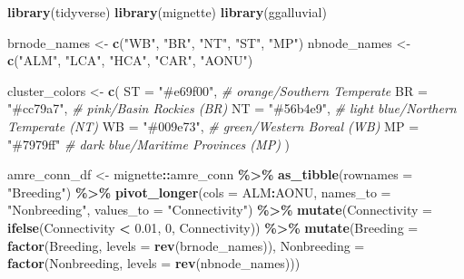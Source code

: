 \documentclass[
]{book}
\newenvironment{Shaded}{\begin{snugshade}}{\end{snugshade}}
\newcommand{\AttributeTok}[1]{\textcolor[rgb]{0.13,0.29,0.53}{#1}}
\newcommand{\CommentTok}[1]{\textcolor[rgb]{0.56,0.35,0.01}{\textit{#1}}}
\newcommand{\DecValTok}[1]{\textcolor[rgb]{0.00,0.00,0.81}{#1}}
\newcommand{\FloatTok}[1]{\textcolor[rgb]{0.00,0.00,0.81}{#1}}
\newcommand{\FunctionTok}[1]{\textcolor[rgb]{0.13,0.29,0.53}{\textbf{#1}}}
\newcommand{\NormalTok}[1]{#1}
\newcommand{\OtherTok}[1]{\textcolor[rgb]{0.56,0.35,0.01}{#1}}
\newcommand{\SpecialCharTok}[1]{\textcolor[rgb]{0.81,0.36,0.00}{\textbf{#1}}}
\newcommand{\StringTok}[1]{\textcolor[rgb]{0.31,0.60,0.02}{#1}}
\begin{document}
\begin{Shaded}
\begin{Highlighting}[]
\FunctionTok{library}\NormalTok{(tidyverse)}
\FunctionTok{library}\NormalTok{(mignette)}
\FunctionTok{library}\NormalTok{(ggalluvial)}

\NormalTok{brnode\_names }\OtherTok{\textless{}{-}} \FunctionTok{c}\NormalTok{(}\StringTok{"WB"}\NormalTok{, }\StringTok{"BR"}\NormalTok{, }\StringTok{"NT"}\NormalTok{, }\StringTok{"ST"}\NormalTok{, }\StringTok{"MP"}\NormalTok{)}
\NormalTok{nbnode\_names }\OtherTok{\textless{}{-}} \FunctionTok{c}\NormalTok{(}\StringTok{"ALM"}\NormalTok{, }\StringTok{"LCA"}\NormalTok{, }\StringTok{"HCA"}\NormalTok{, }\StringTok{"CAR"}\NormalTok{, }\StringTok{"AONU"}\NormalTok{)}

\NormalTok{cluster\_colors }\OtherTok{\textless{}{-}}  \FunctionTok{c}\NormalTok{(}
  \StringTok{\textasciigrave{}}\AttributeTok{ST}\StringTok{\textasciigrave{}} \OtherTok{=} \StringTok{"\#e69f00"}\NormalTok{, }\CommentTok{\# orange/Southern Temperate}
  \StringTok{\textasciigrave{}}\AttributeTok{BR}\StringTok{\textasciigrave{}} \OtherTok{=} \StringTok{"\#cc79a7"}\NormalTok{, }\CommentTok{\# pink/Basin Rockies (BR)}
  \StringTok{\textasciigrave{}}\AttributeTok{NT}\StringTok{\textasciigrave{}} \OtherTok{=} \StringTok{"\#56b4e9"}\NormalTok{, }\CommentTok{\# light blue/Northern Temperate (NT)}
  \StringTok{\textasciigrave{}}\AttributeTok{WB}\StringTok{\textasciigrave{}} \OtherTok{=} \StringTok{"\#009e73"}\NormalTok{, }\CommentTok{\# green/Western Boreal (WB)}
  \StringTok{\textasciigrave{}}\AttributeTok{MP}\StringTok{\textasciigrave{}} \OtherTok{=} \StringTok{"\#7979ff"} \CommentTok{\# dark blue/Maritime Provinces (MP)}
\NormalTok{) }

\NormalTok{amre\_conn\_df }\OtherTok{\textless{}{-}}\NormalTok{ mignette}\SpecialCharTok{::}\NormalTok{amre\_conn }\SpecialCharTok{\%\textgreater{}\%}
  \FunctionTok{as\_tibble}\NormalTok{(}\AttributeTok{rownames =} \StringTok{"Breeding"}\NormalTok{) }\SpecialCharTok{\%\textgreater{}\%}
  \FunctionTok{pivot\_longer}\NormalTok{(}\AttributeTok{cols =}\NormalTok{ ALM}\SpecialCharTok{:}\NormalTok{AONU, }\AttributeTok{names\_to =} \StringTok{"Nonbreeding"}\NormalTok{, }\AttributeTok{values\_to =} \StringTok{"Connectivity"}\NormalTok{) }\SpecialCharTok{\%\textgreater{}\%}
  \FunctionTok{mutate}\NormalTok{(}\AttributeTok{Connectivity =} \FunctionTok{ifelse}\NormalTok{(Connectivity }\SpecialCharTok{\textless{}} \FloatTok{0.01}\NormalTok{, }\DecValTok{0}\NormalTok{, Connectivity)) }\SpecialCharTok{\%\textgreater{}\%}
  \FunctionTok{mutate}\NormalTok{(}\AttributeTok{Breeding =} \FunctionTok{factor}\NormalTok{(Breeding, }\AttributeTok{levels =} \FunctionTok{rev}\NormalTok{(brnode\_names)),}
         \AttributeTok{Nonbreeding =} \FunctionTok{factor}\NormalTok{(Nonbreeding, }\AttributeTok{levels =} \FunctionTok{rev}\NormalTok{(nbnode\_names)))}


\end{Highlighting}
\end{Shaded}
\end{document}

